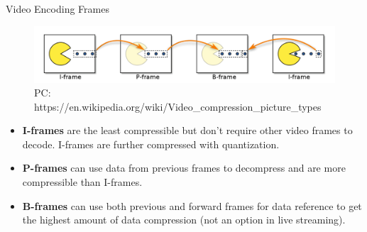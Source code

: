 \begin{frame}{Video Encoding Frames}
  \begin{figure}
    \includegraphics[width=\textwidth]{figures/video-frames.pdf}
    \caption{PC: https://en.wikipedia.org/wiki/Video\_compression\_picture\_types}
  \end{figure}

  \begin{itemize}
  \item \textbf{I-frames} are the least compressible but don't require other
    video frames to decode. I-frames are further compressed with
    quantization.
  \item \textbf{P-frames} can use data from previous frames to decompress
    and are more compressible than I-frames.
  \item \textbf{B-frames} can use both previous and forward frames for data
    reference to get the highest amount of data compression (not an option
    in live streaming).
  \end{itemize}
\end{frame}

